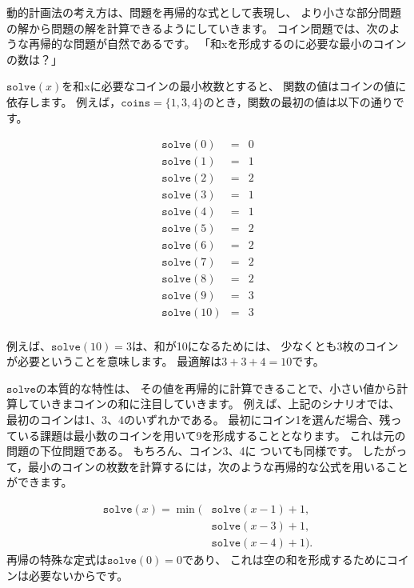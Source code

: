 動的計画法の考え方は、問題を再帰的な式として表現し、
より小さな部分問題の解から問題の解を計算できるようにしていきます。
コイン問題では、次のような再帰的な問題が自然であるです。
「和xを形成するのに必要な最小のコインの数は？」

$\texttt{solve}(x)$を和xに必要なコインの最小枚数とすると、
関数の値はコインの値に依存します。
例えば，$\texttt{coins} = \{1,3,4\}$のとき，関数の最初の値は以下の通りです。

\[
\begin{array}{lcl}
\texttt{solve}(0) & = & 0 \\
\texttt{solve}(1) & = & 1 \\
\texttt{solve}(2) & = & 2 \\
\texttt{solve}(3) & = & 1 \\
\texttt{solve}(4) & = & 1 \\
\texttt{solve}(5) & = & 2 \\
\texttt{solve}(6) & = & 2 \\
\texttt{solve}(7) & = & 2 \\
\texttt{solve}(8) & = & 2 \\
\texttt{solve}(9) & = & 3 \\
\texttt{solve}(10) & = & 3 \\
\end{array}
\]

例えば、$\texttt{solve}(10)=3$は、和が10になるためには、
少なくとも3枚のコインが必要ということを意味します。
最適解は$3+3+4=10$です。

$\texttt{solve}$の本質的な特性は、
その値を再帰的に計算できることで、小さい値から計算していきまコインの和に注目していきます。
例えば、上記のシナリオでは、最初のコインは1、3、4のいずれかである。
最初にコイン1を選んだ場合、残っている課題は最小数のコインを用いて9を形成することとなります。
これは元の問題の下位問題である。
もちろん、コイン3、4に ついても同様です。
したがって，最小のコインの枚数を計算するには，次のような再帰的な公式を用いることができます。

\begin{equation*}
\begin{split}
\texttt{solve}(x) = \min( & \texttt{solve}(x-1)+1, \\
                           & \texttt{solve}(x-3)+1, \\
                           & \texttt{solve}(x-4)+1).
\end{split}
\end{equation*}
再帰の特殊な定式は$\texttt{solve}(0)=0$であり、
これは空の和を形成するためにコインは必要ないからです。

